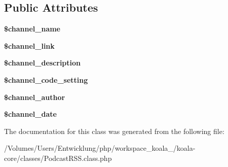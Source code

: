 \subsection*{Public Attributes}
\begin{DoxyCompactItemize}
\item 
\hypertarget{class_podcast_r_s_s_a031dfd53eb23e57aac3922738a675a04}{
{\bfseries \$channel\_\-name}}
\label{class_podcast_r_s_s_a031dfd53eb23e57aac3922738a675a04}

\item 
\hypertarget{class_podcast_r_s_s_ae457881dd2f75073f70730657a03d30f}{
{\bfseries \$channel\_\-link}}
\label{class_podcast_r_s_s_ae457881dd2f75073f70730657a03d30f}

\item 
\hypertarget{class_podcast_r_s_s_af5f5c24d2fdcb037a95b6032347f5ff9}{
{\bfseries \$channel\_\-description}}
\label{class_podcast_r_s_s_af5f5c24d2fdcb037a95b6032347f5ff9}

\item 
\hypertarget{class_podcast_r_s_s_a40b40ccfed3991738e1749d50c614af5}{
{\bfseries \$channel\_\-code\_\-setting}}
\label{class_podcast_r_s_s_a40b40ccfed3991738e1749d50c614af5}

\item 
\hypertarget{class_podcast_r_s_s_ae06b351400b926f54eee2b3cb8a95c00}{
{\bfseries \$channel\_\-author}}
\label{class_podcast_r_s_s_ae06b351400b926f54eee2b3cb8a95c00}

\item 
\hypertarget{class_podcast_r_s_s_a1040083a572bb3a44c10e41f517bc513}{
{\bfseries \$channel\_\-date}}
\label{class_podcast_r_s_s_a1040083a572bb3a44c10e41f517bc513}

\end{DoxyCompactItemize}


The documentation for this class was generated from the following file:\begin{DoxyCompactItemize}
\item 
/Volumes/Users/Entwicklung/php/workspace\_\-koala\_/koala-\/core/classes/PodcastRSS.class.php\end{DoxyCompactItemize}
